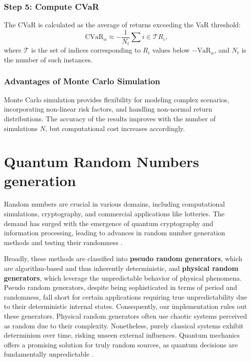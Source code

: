 \documentclass{article}
\begin{document}
\subsubsection{Step 5: Compute CVaR}
The CVaR is calculated as the average of returns exceeding the VaR threshold:
\begin{equation}
\text{CVaR}_{\alpha} \approx - \frac{1}{N_t} \sum{i \in \mathcal{T}} R_i,
\end{equation}
where $\mathcal{T}$ is the set of indices corresponding to $R_i$ values below $-\text{VaR}_{\alpha}$, and $N_t$ is the number of such instances.

\subsubsection{Advantages of Monte Carlo Simulation}
Monte Carlo simulation provides flexibility for modeling complex scenarios, incorporating non-linear risk factors, and handling non-normal return distributions. The accuracy of the results improves with the number of simulations $N$, but computational cost increases accordingly.


\section{Quantum Random Numbers generation}
Random numbers are crucial in various domains, including computational simulations, cryptography, and commercial applications like lotteries. 
The demand has surged with the emergence of quantum cryptography and information processing, leading to advances in random number generation methods and testing their randomness \cite{Jennewein2000}. 

Broadly, these methods are classified into \textbf{pseudo random generators}, which are algorithm-based and thus inherently deterministic, and \textbf{physical random generators}, which leverage the unpredictable behavior of physical phenomena. 
Pseudo random generators, despite being sophisticated in terms of period and randomness, fall short for certain applications requiring true unpredictability due to their deterministic internal states. 
Consequently, our implementation rules out these generators. 
Physical random generators often use chaotic systems perceived as random due to their complexity. 
Nonetheless, purely classical systems exhibit determinism over time, risking unseen external influences. 
Quantum mechanics offers a promising solution for truly random sources, as quantum decisions are fundamentally unpredictable \cite{Ma2016}. 
\end{document}

